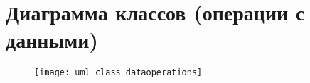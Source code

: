 \chapter{Диаграмма классов (операции с данными)}
\label{app:UML:Class:DataOperations}
\begin{figure}[H]
\texttt{[image: uml\_class\_dataoperations]}
\end{figure}